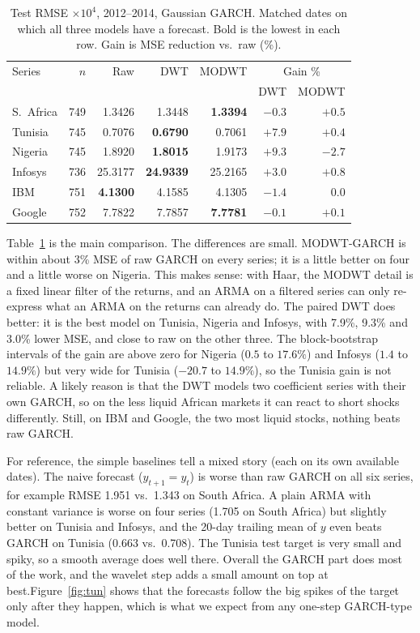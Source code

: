\documentclass{article}
\begin{document}
\begin{table}[t]
\caption{Test RMSE $\times10^4$, 2012--2014, Gaussian GARCH. Matched dates on which all three models have a forecast. Bold is the lowest in each row. Gain is MSE reduction vs.\ raw (\%).}
\label{tab:core}
\centering\small
\setlength{\tabcolsep}{3pt}
\begin{tabular}{lrrrrrr}
\toprule
Series & $n$ & Raw & DWT & MODWT & \multicolumn{2}{c}{Gain \%} \\
 & & & & & DWT & MODWT\\
\midrule
S.\ Africa & 749 & 1.3426 & 1.3448 & \textbf{1.3394} & $-0.3$ & $+0.5$\\
Tunisia & 745 & 0.7076 & \textbf{0.6790} & 0.7061 & $+7.9$ & $+0.4$\\
Nigeria & 745 & 1.8920 & \textbf{1.8015} & 1.9173 & $+9.3$ & $-2.7$\\
Infosys & 736 & 25.3177 & \textbf{24.9339} & 25.2165 & $+3.0$ & $+0.8$\\
IBM & 751 & \textbf{4.1300} & 4.1585 & 4.1305 & $-1.4$ & $0.0$\\
Google & 752 & 7.7822 & 7.7857 & \textbf{7.7781} & $-0.1$ & $+0.1$\\
\bottomrule
\end{tabular}
\end{table}

Table~\ref{tab:core} is the main comparison. The differences are small. MODWT-GARCH is within about 3\% MSE of raw GARCH on every series; it is a little better on four and a little worse on Nigeria. This makes sense: with Haar, the MODWT detail is a fixed linear filter of the returns, and an ARMA on a filtered series can only re-express what an ARMA on the returns can already do. The paired DWT does better: it is the best model on Tunisia, Nigeria and Infosys, with 7.9\%, 9.3\% and 3.0\% lower MSE, and close to raw on the other three. The block-bootstrap intervals of the gain are above zero for Nigeria ($0.5$ to $17.6\%$) and Infosys ($1.4$ to $14.9\%$) but very wide for Tunisia ($-20.7$ to $14.9\%$), so the Tunisia gain is not reliable. A likely reason is that the DWT models two coefficient series with their own GARCH, so on the less liquid African markets it can react to short shocks differently. Still, on IBM and Google, the two most liquid stocks, nothing beats raw GARCH.

For reference, the simple baselines tell a mixed story (each on its own available dates). The naive forecast ($\hat y_{t+1}=y_t$) is worse than raw GARCH on all six series, for example RMSE 1.951 vs.\ 1.343 on South Africa. A plain ARMA with constant variance is worse on four series (1.705 on South Africa) but slightly better on Tunisia and Infosys, and the 20-day trailing mean of $y$ even beats GARCH on Tunisia (0.663 vs.\ 0.708). The Tunisia test target is very small and spiky, so a smooth average does well there. Overall the GARCH part does most of the work, and the wavelet step adds a small amount on top at best.Figure~\ref{fig:tun} shows that the forecasts follow the big spikes of the target only after they happen, which is what we expect from any one-step GARCH-type model.
\end{document}
